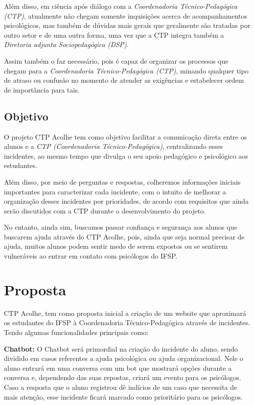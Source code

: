 \documentclass[12pt,a4paper]{article}
\begin{document}
Além disso, em ciência após diálogo com a \textit{Coordenadoria Técnico-Pedagógica (CTP)}, atualmente não chegam somente inquisições acerca de acompanhamentos psicológicos, mas também de dúvidas mais gerais que geralmente são tratadas por outro setor e de uma outra forma, uma vez que a CTP integra também a \textit{Diretoria adjunta Sociopedagógica (DSP)}. 

Assim também o faz necessário, pois é capaz de organizar os processos que chegam para a \textit{Coordenadoria Técnico-Pedagógica (CTP)}, minando qualquer tipo de atraso ou confusão no momento de atender as exigências e estabelecer ordem de importância para tais.


\subsection{Objetivo}

O projeto CTP Acolhe tem como objetivo facilitar a comunicação direta entre os alunos e a \textit{CTP (Coordenadoria Técnico-Pedagógica)}, centralizando esses incidentes, ao mesmo tempo que divulga o seu apoio pedagógico e psicológico aos estudantes.

Além disso, por meio de perguntas e respostas, colheremos informações iniciais importantes para caracterizar cada incidente, com o intuito de melhorar a organização desses incidentes por prioridades, de acordo com requisitos que ainda serão discutidos com a CTP durante o desenvolvimento do projeto.

No entanto, ainda sim, buscamos passar confiança e segurança aos alunos que buscarem ajuda através do CTP Acolhe, pois, ainda que seja normal precisar de ajuda, muitos alunos podem sentir medo de serem expostos ou se sentirem vulneráveis ao entrar em contato com psicólogos do IFSP.

\section{Proposta}

CTP Acolhe, tem como proposta inicial a criação de um website que aproximará os estudantes do IFSP à Coordenadoria Técnico-Pedagógica através de incidentes. Tendo algumas funcionalidades principais como:

\textbf{Chatbot:} O Chatbot será primordial na criação do incidente do aluno,  sendo dividido em casos  referentes a ajuda psicológica ou ajuda organizacional. Nele o aluno entrará em uma conversa com um bot que mostrará opções durante a conversa e, dependendo das suas repostas, criará um evento para os psicólogos. Caso a resposta que o aluno registrou dê indícios de um caso que necessita de mais atenção, esse incidente ficará marcado como prioritário para os psicólogos.
\end{document}
